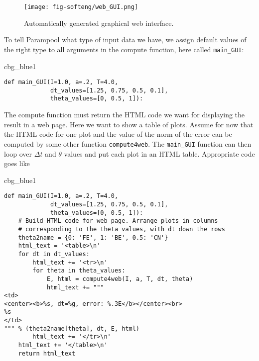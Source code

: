 \documentclass[graybox,sectrefs,envcountresetchap,open=right,final]{svmonodo}
\newenvironment{_cod_tight}[1]{
   \def\FrameCommand{\colorbox{#1}}
   \FrameRule0.6pt\MakeFramed {\FrameRestore}\vskip3mm}
   {\vskip0mm\endMakeFramed}
\newenvironment{cod}[1]{
\bgroup\rmfamily
\fboxsep=0mm\relax
\begin{_cod_tight}{#1}
\list{}{\parsep=-2mm\parskip=0mm\topsep=0pt\leftmargin=2mm
\rightmargin=2\leftmargin\leftmargin=4pt\relax}
\item\relax}
{\endlist\end{_cod_tight}\egroup}
\begin{document}
\begin{figure}[!ht]  %
  \centerline{\texttt{[image: fig-softeng/web\_GUI.png]}}
  \caption{
  Automatically generated graphical web interface. \label{softeng1:fig:GUI}
  }
\end{figure}



To tell Parampool what type of input data we have,
we assign default values of the right type to all arguments in the
compute function, here called \Verb!main_GUI!:

\begin{cod}{cbg_blue1}\begin{Verbatim}[numbers=none,fontsize=\fontsize{9pt}{9pt},baselinestretch=0.95,xleftmargin=2mm]
def main_GUI(I=1.0, a=.2, T=4.0,
             dt_values=[1.25, 0.75, 0.5, 0.1],
             theta_values=[0, 0.5, 1]):
\end{Verbatim}
\end{cod}
\noindent

The compute function must return the HTML code we want for displaying
the result in a web page. Here we want to show a
table of plots.
Assume for now that the HTML code for one plot and the value of the
norm of the error can be computed by some other function \texttt{compute4web}.
The \Verb!main_GUI! function can then loop over $\Delta t$ and $\theta$
values and put each plot in an HTML table. Appropriate code goes like

\begin{cod}{cbg_blue1}\begin{Verbatim}[numbers=none,fontsize=\fontsize{9pt}{9pt},baselinestretch=0.95,xleftmargin=2mm]
def main_GUI(I=1.0, a=.2, T=4.0,
             dt_values=[1.25, 0.75, 0.5, 0.1],
             theta_values=[0, 0.5, 1]):
    # Build HTML code for web page. Arrange plots in columns
    # corresponding to the theta values, with dt down the rows
    theta2name = {0: 'FE', 1: 'BE', 0.5: 'CN'}
    html_text = '<table>\n'
    for dt in dt_values:
        html_text += '<tr>\n'
        for theta in theta_values:
            E, html = compute4web(I, a, T, dt, theta)
            html_text += """
<td>
<center><b>%s, dt=%g, error: %.3E</b></center><br>
%s
</td>
""" % (theta2name[theta], dt, E, html)
        html_text += '</tr>\n'
    html_text += '</table>\n'
    return html_text
\end{Verbatim}
\end{cod}
\noindent
\end{document}
